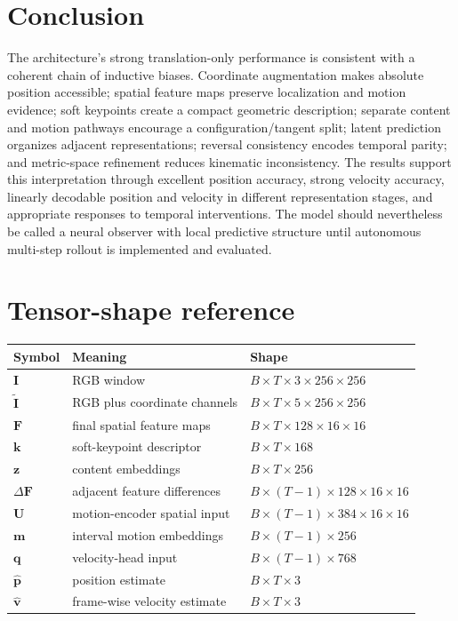 \documentclass[11pt,a4paper]{article}
\begin{document}
\section{Conclusion}
The architecture's strong translation-only performance is consistent with a coherent chain of inductive biases. Coordinate augmentation makes absolute position accessible; spatial feature maps preserve localization and motion evidence; soft keypoints create a compact geometric description; separate content and motion pathways encourage a configuration/tangent split; latent prediction organizes adjacent representations; reversal consistency encodes temporal parity; and metric-space refinement reduces kinematic inconsistency. The results support this interpretation through excellent position accuracy, strong velocity accuracy, linearly decodable position and velocity in different representation stages, and appropriate responses to temporal interventions. The model should nevertheless be called a neural observer with local predictive structure until autonomous multi-step rollout is implemented and evaluated.

\appendix
\section{Tensor-shape reference}
\begin{table}[htbp]\centering
\begin{tabularx}{\textwidth}{lXl}\toprule
Symbol & Meaning & Shape \\\midrule
$\bm I$ & RGB window & $B\times T\times3\times256\times256$\\
$\widetilde{\bm I}$ & RGB plus coordinate channels & $B\times T\times5\times256\times256$\\
$\bm F$ & final spatial feature maps & $B\times T\times128\times16\times16$\\
$\bm k$ & soft-keypoint descriptor & $B\times T\times168$\\
$\bm z$ & content embeddings & $B\times T\times256$\\
$\Delta\bm F$ & adjacent feature differences & $B\times(T-1)\times128\times16\times16$\\
$\bm U$ & motion-encoder spatial input & $B\times(T-1)\times384\times16\times16$\\
$\bm m$ & interval motion embeddings & $B\times(T-1)\times256$\\
$\bm q$ & velocity-head input & $B\times(T-1)\times768$\\
$\widehat{\bm p}$ & position estimate & $B\times T\times3$\\
$\widehat{\bm v}$ & frame-wise velocity estimate & $B\times T\times3$\\\bottomrule
\end{tabularx}
\end{table}
\end{document}
